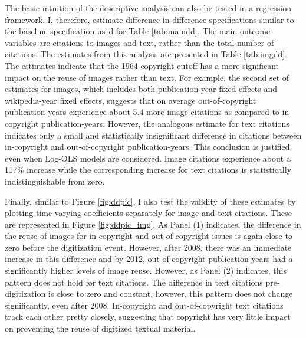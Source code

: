 \documentclass[11pt]{article}
\begin{document}

The basic intuition of the descriptive analysis can also be tested in a regression framework. I, therefore, estimate difference-in-difference specifications similar to the baseline specification used for Table \ref{tab:maindd}. The main outcome variables are citations to images and text, rather than the total number of citations. The estimates from this analysis are presented in Table \ref{tab:imgdd}. The estimates indicate that the 1964 copyright cutoff has a more significant impact on the reuse of images rather than text. For example, the second set of estimates for images, which includes both publication-year fixed effects and wikipedia-year fixed effects, suggests that on average out-of-copyright publication-years experience about 5.4 more image citations as compared to in-copyright publication-years. However, the analogous estimate for text citations indicates only a small and statistically insignificant difference in citations between in-copyright and out-of-copyright publication-years. This conclusion is justified even when Log-OLS models are considered. Image citations experience about a 117\% increase while the corresponding increase for text citations is statistically indistinguishable from zero. 

Finally, similar to Figure \ref{fig:ddpic}, I also test the validity of these estimates by plotting time-varying coefficients separately for image and text citations. These are represented in Figure \ref{fig:ddpic_img}. As Panel (1) indicates, the difference in the reuse of images for in-copyright and out-of-copyright issues is again close to zero before the digitization event. However, after 2008, there was an immediate increase in this difference and by 2012, out-of-copyright publication-years had a significantly higher levels of image reuse. However, as Panel (2) indicates, this pattern does not hold for text citations. The difference in text citations pre-digitization is close to zero and constant, however, this pattern does not change significantly, even after 2008. In-copyright and out-of-copyright text citations track each other pretty closely, suggesting that copyright has very little impact on preventing the reuse of digitized textual material. 
\end{document}
